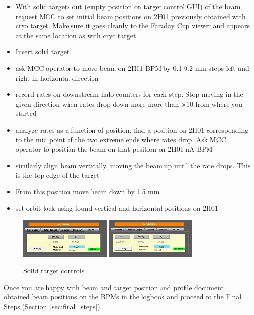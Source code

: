 \begin{itemize}
\item With solid targets out (empty position on target control GUI) of the beam request MCC to set initial beam positions on 2H01 previously obtained with cryo target. Make sure it goes cleanly to the Faraday Cup viewer and appears at the same location as with cryo target.
\item Insert solid target
\item ask MCC operator to move beam on 2H01 BPM by 0.1-0.2 mm steps left and right in horizontal direction
\item record rates on downstream halo counters for each step. Stop moving in the given direction when rates drop down more more than $\times 10$ from where you started 
\item analyze rates as a function of position, find a position on 2H01 corresponding to the mid point of the two extreme ends where rates drop. Ask MCC operator to position the beam on that position on 2H01 nA BPM
\item  similarly align beam vertically, moving the beam up until the rate drops. This is the top edge of the target
\item From this position move beam down by 1.5 mm
\item set orbit lock using found vertical and horizontal positions on 2H01 
\end{itemize}

\begin{figure}[htb!]
\centering
\includegraphics[width=0.4\textwidth]{1foil.PNG}
\includegraphics[width=0.4\textwidth]{2foil.PNG}
\caption{Solid target controls}
\label{fig:foils}
\end{figure}

Once you are happy with beam and target position and profile document obtained beam positions on the BPMs in the logbook and proceed to the Final Steps (Section~\ref{sec:final_steps}).



